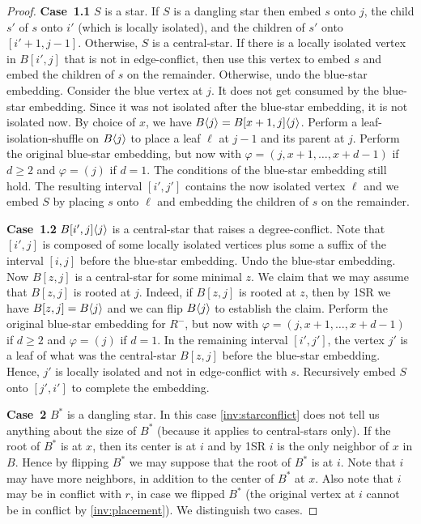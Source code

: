 \documentclass[11pt,a4paper,colorlinks=true,urlcolor=blue,citecolor=red]{article}
\theoremstyle{plain}
\newcommand{\case}[1]{\par\vspace{.5\baselineskip}\noindent\textbf{\sffamily Case~#1}}
\begin{document}
\begin{proof}
  \case{1.1} $S$ is a star. If $S$ is a dangling star then embed $s$
  onto $j$, the child $s'$ of $s$ onto $i'$ (which is locally isolated),
  and the children of $s'$ onto $[i'+1,j-1]$. Otherwise, $S$ is a
  central-star. If there is a locally isolated vertex in $B[i',j]$ that
  is not in edge-conflict, then use this vertex to embed $s$ and embed
  the children of $s$ on the remainder. Otherwise, undo the blue-star
  embedding. Consider the blue vertex at $j$. It does not get consumed
  by the blue-star embedding. Since it was not isolated after the
  blue-star embedding, it is not isolated now. By choice of $x$, we
  have $B\langle{j}\rangle=B{[x+1,j]}\langle{j}\rangle$. Perform a
  leaf-isolation-shuffle on $B\langle{j}\rangle$ to place a leaf $\ell$ at $j-1$
  and its parent at $j$. Perform the original blue-star embedding, but
  now with $\varphi=(j,x+1,\dots,x+d-1)$ if $d\geq 2$ and $\varphi=(j)$ if
  $d=1$. The conditions of the blue-star embedding still hold. The
  resulting interval $[i',j']$ contains the now isolated vertex $\ell$
  and we embed $S$ by placing $s$ onto $\ell$ and embedding the children
  of $s$ on the remainder.

  \case{1.2} $B{[i',j]}\langle{j}\rangle$ is a central-star that raises a
  degree-conflict. Note that $[i',j]$ is composed of some locally
  isolated vertices plus some a suffix of the interval $[i,j]$ before
  the blue-star embedding. Undo the blue-star embedding. Now
  $B[z,j]$ is a central-star for some minimal $z$. We claim that we may
  assume that $B[z,j]$ is rooted at $j$. Indeed, if $B[z,j]$ is rooted
  at $z$, then by 1SR we have $B[z,j]=B\langle{j}\rangle$ and we can flip
  $B\langle{j}\rangle$ to establish the claim. Perform the original blue-star
  embedding for $R^-$, but now with $\varphi=(j,x+1,\dots,x+d-1)$ if $d\geq
  2$ and $\varphi=(j)$ if $d=1$. In the remaining interval $[i',j']$, the
  vertex $j'$ is a leaf of what was the central-star $B[z,j]$ before the
  blue-star embedding. Hence, $j'$ is locally isolated and not in
  edge-conflict with $s$. Recursively embed $S$ onto $[j',i']$ to
  complete the embedding.

  \case{2} $B^*$ is a dangling star. In this case \ref{inv:starconflict}
  does not tell us anything about the size of $B^*$ (because it applies
  to central-stars only). If the root of $B^*$ is at $x$, then its
  center is at $i$ and by 1SR $i$ is the only neighbor of $x$ in $B$.
  Hence by flipping $B^*$ we may suppose that the root of $B^*$ is at
  $i$. Note that $i$ may have more neighbors, in addition to the center
  of $B^*$ at $x$. Also note that $i$ may be in conflict with $r$, in
  case we flipped $B^*$ (the original vertex at $i$ cannot be in
  conflict by \ref{inv:placement}). We distinguish two cases.


\end{proof}
\end{document}
